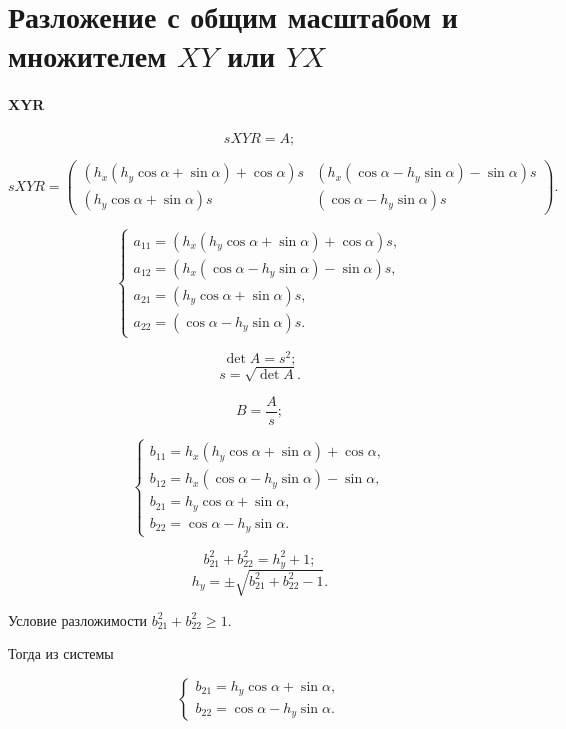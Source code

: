 \section{Разложение с общим масштабом и множителем $XY$ или $YX$}

\paragraph{XYR}

$$sXYR = A;$$

$$sXYR =
\begin{pmatrix}
	\left( {h_x} \left( {h_y} \cos{\alpha} + \sin{\alpha}\right) + \cos{\alpha}\right) s & 
	\left( {h_x} \left( \cos{\alpha} - {h_y}\sin{\alpha} \right) - \sin{\alpha}\right) s \\
	\left( {h_y} \cos{\alpha} + \sin{\alpha}\right) s & 
	\left( \cos{\alpha} - {h_y} \sin{\alpha}\right) s
\end{pmatrix}.
$$

$$
\begin{cases}
	a_{11} = \left( {h_x} \left( {h_y} \cos{\alpha} + \sin{\alpha}\right) + \cos{\alpha}\right) s,\\
	a_{12} = \left( {h_x} \left( \cos{\alpha} - {h_y}\sin{\alpha} \right) - \sin{\alpha}\right) s,\\
	a_{21} = \left( {h_y} \cos{\alpha} + \sin{\alpha}\right) s,\\
	a_{22} = \left( \cos{\alpha} - {h_y} \sin{\alpha}\right) s.
\end{cases}
$$

$$\det A = s^2;$$
$$s = \sqrt{\det A}.$$

$$B = \frac{A}{s};$$

$$
\begin{cases}
	b_{11} = {h_x} \left( {h_y} \cos{\alpha} + \sin{\alpha}\right) + \cos{\alpha},\\
	b_{12} = {h_x} \left( \cos{\alpha} - {h_y}\sin{\alpha} \right) - \sin{\alpha},\\
	b_{21} = {h_y} \cos{\alpha} + \sin{\alpha},\\
	b_{22} = \cos{\alpha} - {h_y} \sin{\alpha}.
\end{cases}
$$

$$b_{21}^2 + b_{22}^2 = h_y^2 + 1;$$
$$h_y = \pm \sqrt{b_{21}^2 + b_{22}^2 - 1}.$$

Условие разложимости $b_{21}^2 + b_{22}^2 \ge 1$.

Тогда из системы

$$
\begin{cases}
	b_{21} = {h_y} \cos{\alpha} + \sin{\alpha},\\
	b_{22} = \cos{\alpha} - {h_y} \sin{\alpha}.
\end{cases}
$$

